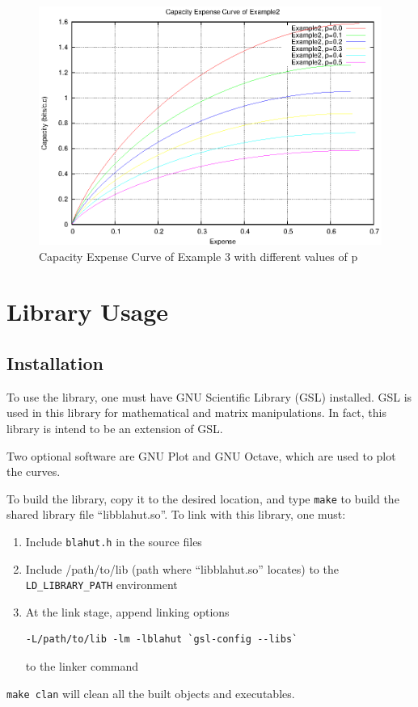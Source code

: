 \documentclass[a4paper,10pt]{article}
\begin{document}
\begin{figure}
 \centering
 \includegraphics[bb=50 50 410 302]{pic/example2_cap.eps}
 \caption{Capacity Expense Curve of Example 3 with different values of p}
 \label{fig:example2_cap}
\end{figure}

\section{Library Usage}
\subsection{Installation}
To use the library, one must have GNU Scientific Library (GSL) installed. GSL is used in this library for mathematical and matrix manipulations. In fact, this library is intend to be an extension of GSL. 

Two optional software are GNU Plot and GNU Octave, which are used to plot the curves.

To build the library, copy it to the desired location, and type \verb|make| to build the shared library file ``libblahut.so''. To link with this library, one must:
\begin{enumerate}
 \item Include \verb|blahut.h| in the source files
 \item Include /path/to/lib (path where ``libblahut.so'' locates) to the \verb|LD_LIBRARY_PATH| environment
 \item At the link stage, append linking options 
\begin{verbatim}
-L/path/to/lib -lm -lblahut `gsl-config --libs`
\end{verbatim}
 to the linker command
\end{enumerate}
\verb|make clan| will clean all the built objects and executables.
\end{document}
